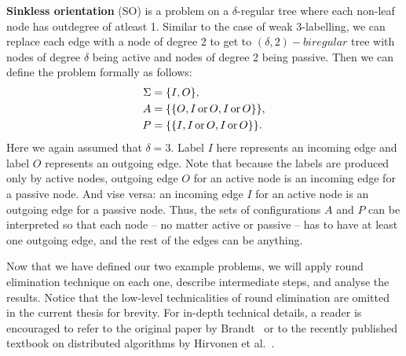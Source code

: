\textbf{Sinkless orientation} (SO) is a problem on a $\delta$-regular tree
where each non-leaf node has outdegree of atleast 1. Similar to the case of weak 3-labelling,
we can replace each edge with a node of degree 2 to get to $(\delta, 2)-biregular$ tree with
nodes of degree $\delta$ being active and nodes of degree 2 being passive.
Then we can define the problem formally as follows:
\begin{align*}
\Sigma &= \{I, O\}, \\
A &= \{ \{O, I \operatorname{or} O, I \operatorname{or} O\} \}, \\
P &= \{ \{I, I \operatorname{or} O, I \operatorname{or} O\}\}.
\end{align*}
Here we again assumed that $\delta = 3$. Label $I$ here represents
an incoming edge and label $O$ represents an outgoing edge.
Note that because the labels are produced only by active nodes,
outgoing edge $O$ for an active node is an incoming edge for a 
passive node. And vise versa: an incoming edge $I$ for an active node
is an outgoing edge for a passive node. Thus, the sets of configurations
$A$ and $P$ can be interpreted so that each node -- no matter active or passive --
has to have at least one outgoing edge, and the rest of the edges can be anything.

Now that we have defined our two example problems,
we will apply round elimination
technique on each one, describe intermediate steps, and analyse the results.
Notice that the low-level technicalities of round elimination
are omitted in the current thesis for brevity. For in-depth technical details, a reader is encouraged
to refer to the original paper by Brandt~\cite{Brandt2019} or to the recently published textbook on distributed algorithms
by Hirvonen et al.~\cite{Hirvonen2020}.


